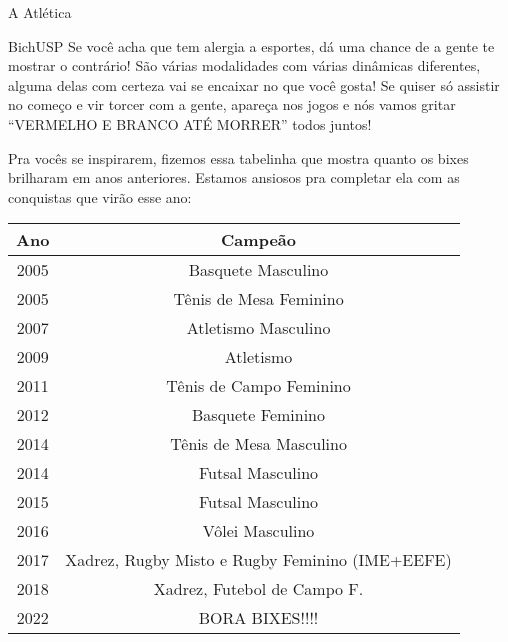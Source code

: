 \begin{secao}{A Atlética}
\begin{subsecao}{BichUSP}
Se você acha que tem alergia a esportes, dá uma chance de a gente te mostrar
o contrário! São várias modalidades com várias dinâmicas diferentes, alguma
delas com certeza vai se encaixar no que você gosta! Se quiser só assistir
no começo e vir torcer com a gente, apareça nos jogos e nós vamos gritar
``VERMELHO E BRANCO ATÉ MORRER'' todos juntos!



Pra vocês se inspirarem, fizemos essa tabelinha que mostra quanto os bixes
brilharam em anos anteriores. Estamos ansiosos pra completar ela com as
conquistas que virão esse ano:

\begin{center}
  \begin{tabular}{c|c}
    \hline
    Ano & Campeão\\
    \hline
    2005 & Basquete Masculino \\
    2005 & Tênis de Mesa Feminino \\
    2007 & Atletismo Masculino\\
    2009 & Atletismo\\
    2011 & Tênis de Campo Feminino\\
    2012 & Basquete Feminino\\
    2014 & Tênis de Mesa Masculino\\
    2014 & Futsal Masculino\\
    2015 & Futsal Masculino\\
    2016 & Vôlei Masculino\\
    2017 & Xadrez, Rugby Misto e Rugby Feminino (IME+EEFE)\\
    2018 & Xadrez, Futebol de Campo F.\\
    2022 & BORA BIXES!!!!
    \hline
  \end{tabular}
\end{center}


\end{subsecao}
\end{secao}

